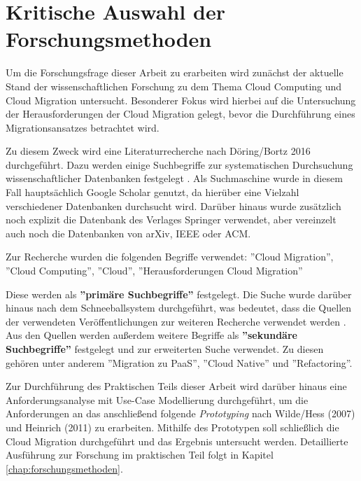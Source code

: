 \section{Kritische Auswahl der Forschungsmethoden}
\label{sec:auswahl_forschungsmethoden}


Um die Forschungsfrage dieser Arbeit zu erarbeiten wird zunächst der aktuelle Stand der wissenschaftlichen Forschung zu dem Thema Cloud Computing und Cloud Migration untersucht. Besonderer Fokus wird hierbei auf die Untersuchung der Herausforderungen der Cloud Migration gelegt, bevor die Durchführung eines Migrationsansatzes betrachtet wird.

Zu diesem Zweck wird eine Literaturrecherche nach Döring/Bortz 2016 durchgeführt. Dazu werden einige Suchbegriffe zur systematischen Durchsuchung wissenschaftlicher Datenbanken festgelegt \cite[Vgl.][S. 158]{Doering2016}. Als Suchmaschine wurde in diesem Fall hauptsächlich Google Scholar genutzt, da hierüber eine Vielzahl verschiedener Datenbanken durchsucht wird. Darüber hinaus wurde zusätzlich noch explizit die Datenbank des Verlages Springer verwendet, aber vereinzelt auch noch die Datenbanken von arXiv, IEEE oder ACM.

Zur Recherche wurden die folgenden Begriffe verwendet: ''Cloud Migration'', ''Cloud Computing'', ''Cloud'', ''Herausforderungen Cloud Migration''

Diese werden als \textbf{''primäre Suchbegriffe''} \cite[S. 158]{Doering2016} festgelegt. Die Suche wurde darüber hinaus nach dem Schneeballsystem durchgeführt, was bedeutet, dass die Quellen der verwendeten Veröffentlichungen zur weiteren Recherche verwendet werden \cite[Vgl.][S. 160]{Doering2016}. Aus den Quellen werden außerdem weitere Begriffe als \textbf{''sekundäre Suchbegriffe''} \cite[S. 158]{Doering2016} festgelegt und zur erweiterten Suche verwendet. Zu diesen gehören unter anderem ''Migration zu PaaS'', ''Cloud Native'' und ''Refactoring''.

Zur Durchführung des Praktischen Teils dieser Arbeit wird darüber hinaus eine Anforderungsanalyse mit Use-Case Modellierung durchgeführt, um die Anforderungen an das anschließend folgende \textit{Prototyping} nach Wilde/Hess (2007) und Heinrich (2011) zu erarbeiten. Mithilfe des Prototypen soll schließlich die Cloud Migration durchgeführt und das Ergebnis untersucht werden. Detaillierte Ausführung zur Forschung im praktischen Teil folgt in Kapitel \ref{chap:forschungsmethoden}.